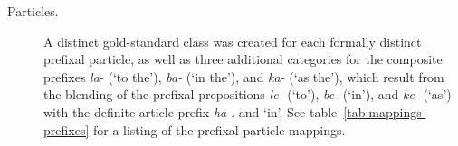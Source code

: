 {\begin{description}


\item[Particles.]
A distinct gold-standard class was created for each formally distinct prefixal particle, as well as three additional categories for the composite
prefixes \textit{la-} (`to the'), \textit{ba-} (`in the'), and \textit{ka-} (`as the'), 
which result from the blending of the prefixal prepositions \textit{le-} (`to'), 
\textit{be-} (`in'), and \textit{ke-} (`as') with the definite-article prefix \textit{ha-}.
and  `in'. See table~\ref{tab:mappings-prefixes} for a listing of the prefixal-particle mappings.
\end{description}

}
